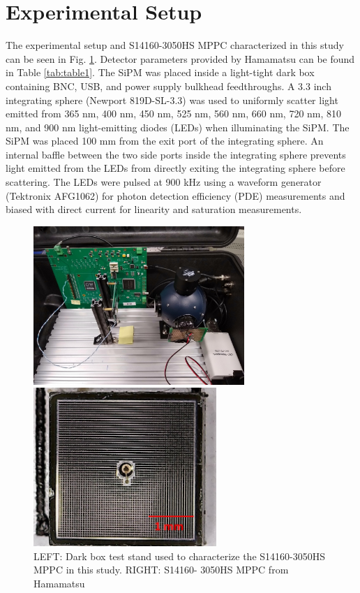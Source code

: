 \documentclass{article}
\begin{document}
\section{Experimental Setup}
The experimental setup and S14160-3050HS MPPC characterized in this study can be seen in Fig. \ref{fig:DarkBoxTest}. Detector parameters provided by Hamamatsu\cite{hamamtsu2016s13360} can be found in Table \ref{tab:table1}. The SiPM was placed inside a light-tight dark box containing BNC, USB, and power supply bulkhead feedthroughs. A 3.3 inch integrating sphere (Newport 819D-SL-3.3) was used to uniformly scatter light emitted from 365 nm, 400 nm, 450 nm, 525 nm, 560 nm, 660 nm, 720 nm, 810 nm, and 900 nm light-emitting diodes (LEDs) when illuminating the SiPM. The SiPM was placed 100 mm from the exit port of the integrating sphere. An internal baffle between the two side ports inside the integrating sphere prevents light emitted from the LEDs from directly exiting the integrating sphere before scattering. The LEDs were pulsed at 900 kHz using a waveform generator (Tektronix AFG1062) for photon detection efficiency (PDE) measurements and biased with direct current for linearity and saturation measurements.

\begin{figure}[htb]
    \centering
    \begin{minipage}[b]{0.49\textwidth}
    \centering
    \includegraphics[height=6cm]{images/figura1.jpg}
    \end{minipage}
    \hfill
    \begin{minipage}[b]{0.49\textwidth}
    \centering
    \includegraphics[height=6cm]{images/figura2.jpg}
    \end{minipage}

    \caption{LEFT: Dark box test stand used to characterize the S14160-3050HS MPPC in this study. RIGHT: S14160- 3050HS MPPC from Hamamatsu}
    
    \label{fig:DarkBoxTest}
\end{figure}
\end{document}
